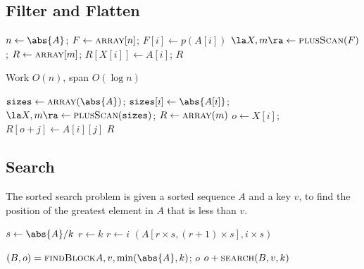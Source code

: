 \documentclass[11pt]{article}
\begin{document}
\subsection{Filter and Flatten}
\label{sec:org231c1e5}
\begin{algorithmic}
        \State \(n\gets\abs{A}\);
        \State \(F\gets\textsc{array}[n]\);
        \State \(F[i]\gets p(A[i])\)
        \EndFor
        \State \(\la X,m\ra\gets\textsc{plusScan}(F)\);
        \State \(R\gets\textsc{array}[m]\);
                \State\(R[X[i]]\gets A[i]\);
        \EndIf
        \EndFor
        \State\Return \(R\)
\EndFunction
\end{algorithmic}

Work \(O(n)\), span \(O(\log n)\)

\begin{algorithmic}
\State \(\texttt{sizes}\gets\textsc{array}(\abs{A})\);
        \State \(\texttt{sizes}[i]\gets\abs{A[i]}\);
\EndFor
\State \(\la X,m\ra\gets\textsc{plusScan}(\texttt{sizes})\);
\State \(R\gets\textsc{array}(m)\)
        \State \(o\gets X[i]\);
                \State\(R[o+j]\gets A[i][j]\)
        \EndFor
\EndFor
\State \Return\(R\)
\EndFunction
\end{algorithmic}
\subsection{Search}
\label{sec:org64519cc}
The sorted search problem is given a sorted sequence \(A\) and a key \(v\), to find the position of the
greatest element in \(A\) that is less than \(v\).

\begin{algorithmic}
\State \(s\gets\abs{A}/k\)
\State \(r\gets k\)
                \State \(r\gets i\)
        \EndIf
\EndFor
\State \Return \((A[r\times s,(r+1)\times s],i\times s)\)
\EndFunction
\end{algorithmic}

\begin{algorithmic}
\State \((B,o)=\textsc{findBlock}{A,v,\min(\abs{A},k)}\);
        \State \Return \(o\)
\Else
        \State \Return \(o+\textsc{search}(B,v,k)\)
\EndIf
\EndFunction
\end{algorithmic}
\end{document}
